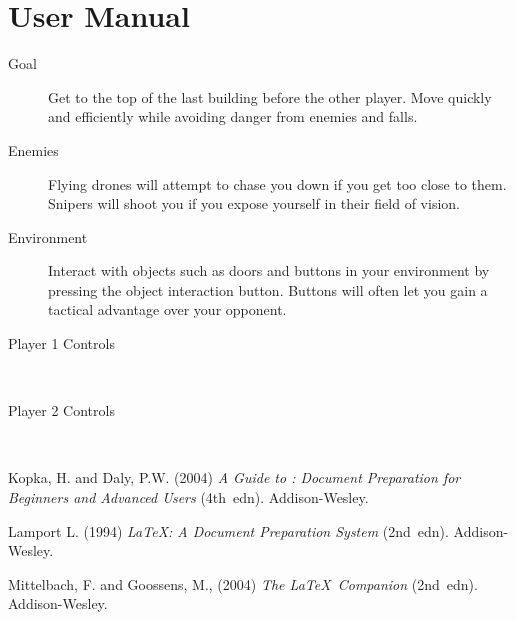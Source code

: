 \documentclass[11pt,a4paper]{article}
\newcommand{\itab}[1]{\hspace{0em}\rlap{#1}}
\newcommand{\tab}[1]{\hspace{.2\textwidth}\rlap{#1}}
\begin{document}
\section*{User Manual}
\label{ss:user-manual}
\begin{description}
	\item [Goal] Get to the top of the last building before the other player. Move quickly and efficiently while avoiding danger from enemies and falls.
	\item [Enemies] Flying drones will attempt to chase you down if you get too close to them. Snipers will shoot you if you expose yourself in their field of vision.
	\item [Environment] Interact with objects such as doors and buttons in your environment by pressing the object interaction button. Buttons will often let you gain a tactical advantage over your opponent.
	\item [Player 1 Controls]\hfill \\
	\item [Player 2 Controls]\hfill \\
\end{description}
\newpage
\begin{thebibliography}{9}

Kopka, H. and Daly, P.W.  (2004) \textit{A Guide to \LaTeXe:
Document Preparation for Beginners and Advanced Users} (4th~edn).
Addison-Wesley.

Lamport L. (1994) \textit{\LaTeX: A Document Preparation System}
(2nd~edn). Addison-Wesley.

Mittelbach, F. and Goossens, M., (2004) \textit{The \LaTeX\
Companion} (2nd~edn). Addison-Wesley.
\end{thebibliography}
\end{document}
